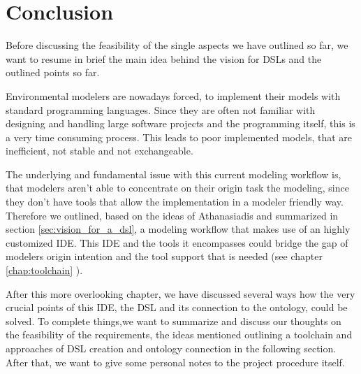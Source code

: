 \chapter{Conclusion}
\par
Before discussing the feasibility of the single aspects we have outlined so far, we want to resume in brief the main idea behind the vision for DSLs and the outlined points so far.
\par
Environmental modelers are nowadays forced, to implement their models with standard programming languages. Since they are often not familiar with designing and handling large software projects and the programming itself, this is a very time consuming process. This leads to poor implemented models, that are inefficient, not stable and not exchangeable.
\par
The underlying and fundamental issue with this current modeling workflow is, that modelers aren’t able to concentrate on their origin task the modeling, since they don't have tools that allow the implementation in a modeler friendly way. Therefore we outlined, based on the ideas of Athanasiadis and summarized in section \ref{sec:vision_for_a_dsl}, a modeling workflow that makes use of an highly customized IDE. This IDE and the tools it encompasses could bridge the gap of modelers origin intention and the tool support that is needed (see chapter \ref{chap:toolchain} ).
\par
After this more overlooking chapter, we have discussed several ways how the very crucial points of this IDE, the DSL and its connection to the ontology, could be solved. To complete things,we want to summarize and discuss our thoughts on the feasibility of the requirements, the ideas mentioned outlining a toolchain and approaches of DSL creation and ontology connection in the following section. After that, we want to give some personal notes to the project procedure itself. 
